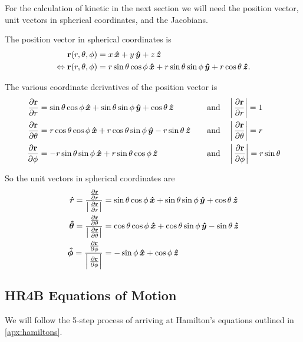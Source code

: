 For the calculation of kinetic in the next section we will need the position vector, unit vectors in spherical coordinates, and the Jacobians.

The position vector in spherical coordinates is
\begin{align}
    \mathbf{r}(r, \theta, \phi) &= x \operatorname{}\!\bm{\hat{x}} + y \operatorname{}\!\bm{\hat{y}} + z \operatorname{}\!\bm{\hat{z}} \\
    \Leftrightarrow \mathbf{r}(r, \theta, \phi) &= r \sin{\theta}\cos{\phi} \operatorname{}\!\bm{\hat{x}} + r \sin{\theta}\sin{\phi} \operatorname{}\!\bm{\hat{y}} + r \cos{\theta} \operatorname{}\!\bm{\hat{z}}. \label{eq:position-vec-spherical}
\end{align}

The various coordinate derivatives of the position vector is
\begin{align}
    \pd{\vec{r}}{r} &= \sin{\theta}\cos{\phi} \xhat + \sin{\theta}\sin{\phi} \yhat + \cos{\theta} \zhat \quad &\text{and} \quad &\left| \pd{\vec{r}}{r} \right| = 1 \label{eq:position-derived-r} \\
    \pd{\vec{r}}{\theta} &= r \cos{\theta}\cos{\phi} \xhat + r \cos{\theta}\sin{\phi} \yhat - r \sin{\theta} \zhat \quad &\text{and} \quad &\left| \pd{\vec{r}}{\theta} \right| = r \label{eq:position-derived-theta} \\
    \pd{\vec{r}}{\phi} &= -r\sin{\theta}\sin{\phi} \xhat + r\sin{\theta}\cos{\phi} \zhat \quad &\text{and} \quad &\left| \pd{\vec{r}}{\phi} \right| = r\sin{\theta} \label{eq:position-derived-phi}
\end{align}

So the unit vectors in spherical coordinates are
\begin{align}
    \rhat = \dfrac{\pd{\vec{r}}{r}}{\left| \pd{\vec{r}}{r} \right| } &= \sin{\theta}\cos{\phi} \xhat + \sin{\theta}\sin{\phi} \yhat + \cos{\theta} \zhat \label{eq:r-hat}\\
    \thetahat = \dfrac{\pd{\vec{r}}{\theta}}{\left| \pd{\vec{r}}{\theta} \right| } &= \cos{\theta}\cos{\phi} \xhat + \cos{\theta}\sin{\phi} \yhat - \sin{\theta} \zhat \label{eq:theta-hat}\\
    \phihat = \dfrac{\pd{\vec{r}}{\phi}}{\left| \pd{\vec{r}}{\phi} \right| } &= -\sin{\phi} \xhat + \cos{\phi} \zhat \label{eq:phi-hat}
\end{align}

\subsection{HR4B Equations of Motion}
We will follow the 5-step process of arriving at Hamilton's equations outlined in \cref{apx:hamiltons}.

